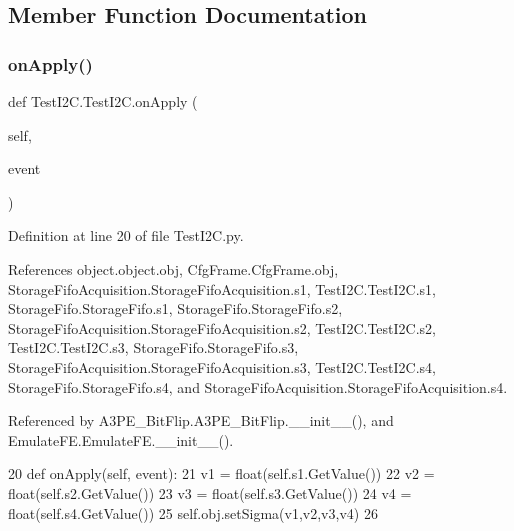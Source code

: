 \subsection{Member Function Documentation}
\mbox{\label{classTestI2C_1_1TestI2C_a6737e8674436af268fa39e4d6ebea064}} 
\subsubsection{\texorpdfstring{on\+Apply()}{onApply()}}
{\footnotesize\ttfamily def Test\+I2\+C.\+Test\+I2\+C.\+on\+Apply (\begin{DoxyParamCaption}\item[{}]{self,  }\item[{}]{event }\end{DoxyParamCaption})}



Definition at line 20 of file Test\+I2\+C.\+py.



References object.\+object.\+obj, Cfg\+Frame.\+Cfg\+Frame.\+obj, Storage\+Fifo\+Acquisition.\+Storage\+Fifo\+Acquisition.\+s1, Test\+I2\+C.\+Test\+I2\+C.\+s1, Storage\+Fifo.\+Storage\+Fifo.\+s1, Storage\+Fifo.\+Storage\+Fifo.\+s2, Storage\+Fifo\+Acquisition.\+Storage\+Fifo\+Acquisition.\+s2, Test\+I2\+C.\+Test\+I2\+C.\+s2, Test\+I2\+C.\+Test\+I2\+C.\+s3, Storage\+Fifo.\+Storage\+Fifo.\+s3, Storage\+Fifo\+Acquisition.\+Storage\+Fifo\+Acquisition.\+s3, Test\+I2\+C.\+Test\+I2\+C.\+s4, Storage\+Fifo.\+Storage\+Fifo.\+s4, and Storage\+Fifo\+Acquisition.\+Storage\+Fifo\+Acquisition.\+s4.



Referenced by A3\+P\+E\+\_\+\+Bit\+Flip.\+A3\+P\+E\+\_\+\+Bit\+Flip.\+\_\+\+\_\+init\+\_\+\+\_\+(), and Emulate\+F\+E.\+Emulate\+F\+E.\+\_\+\+\_\+init\+\_\+\+\_\+().


\begin{DoxyCode}
20     \textcolor{keyword}{def }onApply(self, event):
21         v1 = float(self.s1.GetValue())
22         v2 = float(self.s2.GetValue())
23         v3 = float(self.s3.GetValue())
24         v4 = float(self.s4.GetValue())
25         self.obj.setSigma(v1,v2,v3,v4)
26 
\end{DoxyCode}
\mbox{\label{classTestI2C_1_1TestI2C_aa09430186d2af74fae791a1af932db65}} 
